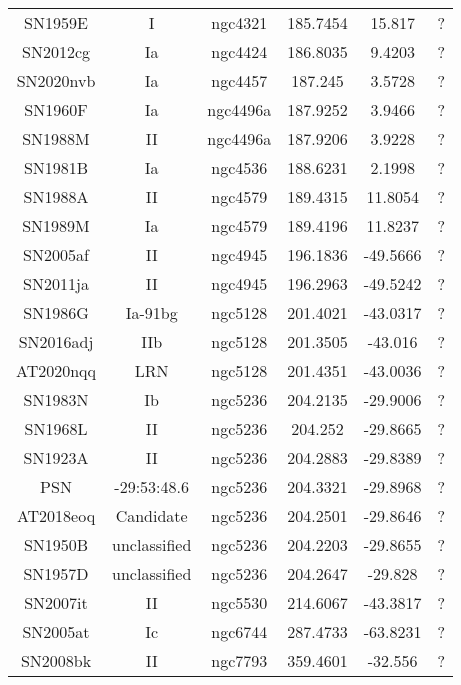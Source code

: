 \begin{table}
\begin{tabular}{cccccc}
SN1959E & I & ngc4321 & 185.7454 & 15.817 & ? \\
SN2012cg & Ia & ngc4424 & 186.8035 & 9.4203 & ? \\
SN2020nvb & Ia & ngc4457 & 187.245 & 3.5728 & ? \\
SN1960F & Ia & ngc4496a & 187.9252 & 3.9466 & ? \\
SN1988M & II & ngc4496a & 187.9206 & 3.9228 & ? \\
SN1981B & Ia & ngc4536 & 188.6231 & 2.1998 & ? \\
SN1988A & II & ngc4579 & 189.4315 & 11.8054 & ? \\
SN1989M & Ia & ngc4579 & 189.4196 & 11.8237 & ? \\
SN2005af & II & ngc4945 & 196.1836 & -49.5666 & ? \\
SN2011ja & II & ngc4945 & 196.2963 & -49.5242 & ? \\
SN1986G & Ia-91bg & ngc5128 & 201.4021 & -43.0317 & ? \\
SN2016adj & IIb & ngc5128 & 201.3505 & -43.016 & ? \\
AT2020nqq & LRN & ngc5128 & 201.4351 & -43.0036 & ? \\
SN1983N & Ib & ngc5236 & 204.2135 & -29.9006 & ? \\
SN1968L & II & ngc5236 & 204.252 & -29.8665 & ? \\
SN1923A & II & ngc5236 & 204.2883 & -29.8389 & ? \\
PSN & -29:53:48.6 & ngc5236 & 204.3321 & -29.8968 & ? \\
AT2018eoq & Candidate & ngc5236 & 204.2501 & -29.8646 & ? \\
SN1950B & unclassified & ngc5236 & 204.2203 & -29.8655 & ? \\
SN1957D & unclassified & ngc5236 & 204.2647 & -29.828 & ? \\
SN2007it & II & ngc5530 & 214.6067 & -43.3817 & ? \\
SN2005at & Ic & ngc6744 & 287.4733 & -63.8231 & ? \\
SN2008bk & II & ngc7793 & 359.4601 & -32.556 & ? \\
\end{tabular}
\end{table}
